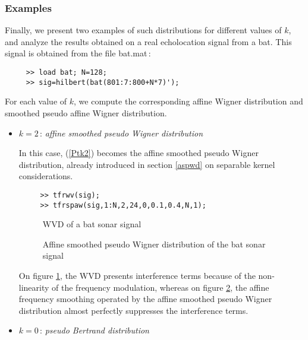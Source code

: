 \subsubsection{Examples}

  Finally, we present two examples of such distributions for different
values of $k$, and analyze the results obtained on a real echolocation
signal from a bat. This signal is obtained from the file {\ttfamily
bat.mat}\,:
\begin{verbatim}
     >> load bat; N=128;
     >> sig=hilbert(bat(801:7:800+N*7)');
\end{verbatim}
For each value of $k$, we compute the corresponding affine Wigner
distribution and smoothed pseudo affine Wigner distribution.
\begin{itemize}
\item $k=2$\,: {\it affine smoothed pseudo Wigner distribution }

  In this case, (\ref{Ptk2}) becomes the affine smoothed pseudo Wigner
distribution, already introduced in section \ref{aspwd} on separable kernel
considerations.
\begin{verbatim}
     >> tfrwv(sig); 
     >> tfrspaw(sig,1:N,2,24,0,0.1,0.4,N,1); 
\end{verbatim}
\begin{figure}[htb]
\epsfxsize=10cm
\epsfysize=8cm
\centerline{}
\caption{\label{En2fig13}WVD of a bat sonar signal}
\end{figure}
\begin{figure}[htb]
\epsfxsize=10cm
\epsfysize=8cm
\centerline{}
\caption{\label{En2fig14}Affine smoothed pseudo Wigner distribution of the
bat sonar signal}
\end{figure}
On figure \ref{En2fig13}, the WVD presents interference terms because of
the non-linearity of the frequency modulation, whereas on figure
\ref{En2fig14}, the affine frequency smoothing operated by the affine
smoothed pseudo Wigner distribution almost perfectly suppresses the
interference terms.

\item $k=0$\,: {\it pseudo Bertrand distribution}


\end{itemize}
